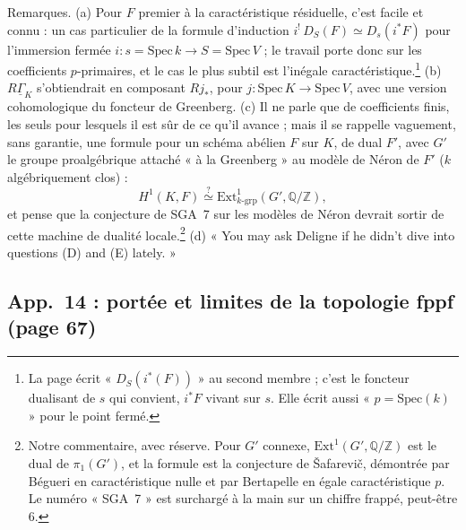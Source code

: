 \documentclass[11pt,a4paper]{article}
\begin{document}
Remarques. (a) Pour $F$ premier à la caractéristique résiduelle, c'est facile
et connu : un cas particulier de la formule d'induction
$i^!\,D_S(F) \simeq D_s(i^*F)$ pour l'immersion fermée
$i : s = \mathrm{Spec}\,k \to S = \mathrm{Spec}\,V$ ; le travail porte donc
sur les coefficients $p$-primaires, et le cas le plus subtil est
l'inégale caractéristique.\footnote{La page écrit « $D_S(i^*(F))$ » au second
membre ; c'est le foncteur dualisant de $s$ qui convient, $i^*F$ vivant sur
$s$. Elle écrit aussi « $p = \mathrm{Spec}(k)$ » pour le point fermé.}
(b) $R\underline{\Gamma}_K$ s'obtiendrait en composant $Rj_*$, pour
$j : \mathrm{Spec}\,K \to \mathrm{Spec}\,V$, avec une version cohomologique
du foncteur de Greenberg. (c) Il ne parle que de coefficients finis, les
seuls pour lesquels il est sûr de ce qu'il avance ; mais il se rappelle
vaguement, sans garantie, une formule pour un schéma abélien $F$ sur $K$, de
dual $F'$, avec $G'$ le groupe proalgébrique attaché « à la Greenberg » au
modèle de Néron de $F'$ ($k$ algébriquement clos) :
\[
H^1(K,F) \overset{?}{\simeq} \mathrm{Ext}^1_{k\text{-grp}}(G',\mathbb{Q}/\mathbb{Z}),
\]
et pense que la conjecture de SGA~7 sur les modèles de Néron devrait sortir
de cette machine de dualité locale.\footnote{Notre commentaire, avec
réserve. Pour $G'$ connexe, $\mathrm{Ext}^1(G',\mathbb{Q}/\mathbb{Z})$ est le
dual de $\pi_1(G')$, et la formule est la conjecture de Šafarevič, démontrée
par Bégueri en caractéristique nulle et par Bertapelle en égale
caractéristique $p$. Le numéro « SGA~7 » est surchargé à la main sur un
chiffre frappé, peut-être 6.} (d) « You may ask Deligne if he didn't dive
into questions (D) and (E) lately. »

\subsection*{App.~14 : portée et limites de la topologie fppf (page 67)}
\end{document}
